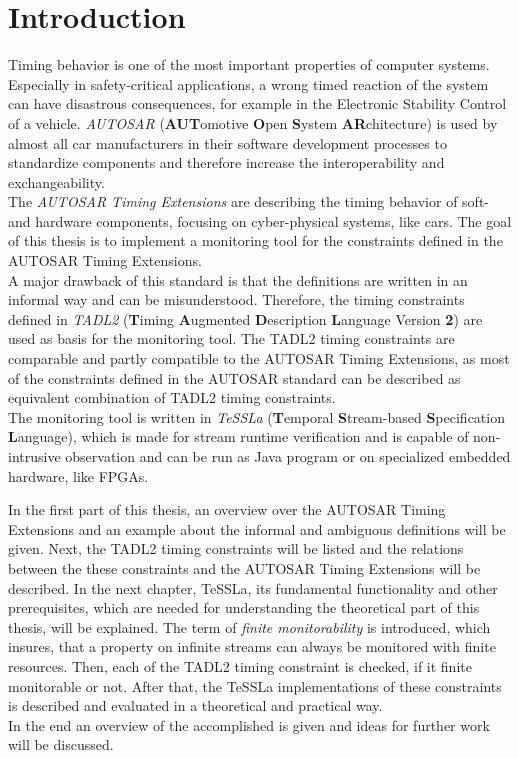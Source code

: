 
\chapter{Introduction}

Timing behavior is one of the most important properties of computer systems. Especially in safety-critical applications, a wrong timed reaction of the system can have disastrous consequences, for example in the Electronic Stability Control of a vehicle. \emph{AUTOSAR} (\textbf{AUT}omotive \textbf{O}pen \textbf{S}ystem \textbf{AR}chitecture) is used by almost all car manufacturers in their software development processes to standardize components and therefore increase the interoperability and exchangeability.\\
The \emph{AUTOSAR Timing Extensions} are describing the timing behavior of soft- and hardware components, focusing on cyber-physical systems, like cars. The goal of this thesis is to implement a monitoring tool for the constraints defined in the AUTOSAR Timing Extensions.\\
A major drawback of this standard is that the definitions are written in an informal way and can be misunderstood. Therefore, the timing constraints defined in \emph{TADL2} (\textbf{T}iming \textbf{A}ugmented \textbf{D}escription \textbf{L}anguage Version \textbf{2}) are used as basis for the monitoring tool. The TADL2 timing constraints are comparable and partly compatible to the AUTOSAR Timing Extensions, as most of the constraints defined in the AUTOSAR standard can be described as equivalent combination of TADL2 timing constraints.\\
The monitoring tool is written in \emph{TeSSLa} (\textbf{T}emporal \textbf{S}tream-based \textbf{S}pecification \textbf{L}anguage), which is made for stream runtime verification and is capable of non-intrusive observation and can be run as Java program or on specialized embedded hardware, like FPGAs.

In the first part of this thesis, an overview over the AUTOSAR Timing Extensions and an example about the informal and ambiguous definitions  will be given. Next, the TADL2 timing constraints will be listed and the relations between the these constraints and the AUTOSAR Timing Extensions will be described.
In the next chapter, TeSSLa, its fundamental functionality and other prerequisites, which are needed for understanding the theoretical part of this thesis, will be explained.
The term of \emph{finite monitorability} is introduced, which insures, that a property on infinite streams can always be monitored with finite resources.
Then, each of the TADL2 timing constraint is checked, if it finite monitorable or not. After that, the TeSSLa implementations of these constraints is described and evaluated in a theoretical and practical way.\\
In the end an overview of the accomplished is given and ideas for further work will be discussed.